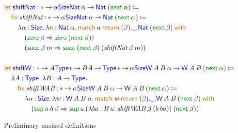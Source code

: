 \documentclass{article}
\newcommand{\meta}[1]{\mathsf{\textcolor{metacolour}{#1}}}
\newcommand{\ind}[1]{\mathsf{\textcolor{indcolour}{#1}}}
\newcommand{\constr}[1]{\mathsf{\textcolor{constrcolour}{#1}}}
\newcommand{\kw}[1]{\mathsf{\textcolor{kwcolour}{#1}}}
\newcommand{\kwopen}[1]{\kw{#1}\:}
\newcommand{\kwbin}[1]{\:\kw{#1}\:}
\newcommand{\arr}[2]{#1 \mathbin{\rightarrow} #2}
\newcommand{\lam}[3]{\lambda #1 \mathbin{:} #2 \mathpunct{.} #3}
\newcommand{\app}[2]{#1 \: #2}
\newcommand{\Let}[3]{\kwopen{let} \mathopen{} #1 \mathbin{:} #2 \mathbin{\coloneqq} #3}
\newcommand{\Type}[1]{\ind{Type}_{#1}}
\newcommand{\match}[3]{\kwopen{match} #1 \kwbin{return} #2 \kwbin{with} #3}
\newcommand{\fix}[3]{\kwopen{fix} #1 \mathbin{:} #2 \mathbin{\coloneqq} #3}
\newcommand{\Size}{\ind{Size}}
\newcommand{\next}{\constr{next}}
\newcommand{\Nat}{\ind{Nat}}
\newcommand{\zero}{\constr{zero}}
\renewcommand{\succ}{\constr{succ}}
\newcommand{\Wtype}{\ind{W}}
\renewcommand{\sup}{\ind{\constr{sup}}}
\newcommand{\any}{\meta{\texttt{\_}}}
\begin{document}
\begin{figure}[h]
\begin{align*}
        \hfill \\
        &\Let{\ind{shiftNat}}{\arr*{\alpha}{\Size}{\arr{\app{\Nat}{\alpha}}{\app{\Nat}{(\app{\next}{\alpha})\:}}}}{ \\
        &\quad\fix{\textit{shiftNat}}{\arr*{\alpha}{\Size}{\arr{\app{\Nat}{\alpha}}{\app{\Nat}{(\app{\next}{\alpha})\:}}}}{ \\
        &\qquad\lam{\alpha}{\Size}{\lam{n}{\app{\Nat}{\alpha}}{\match{n}{(\beta).\any.\app{\Nat}{(\app{\next}{\beta})}}{ \\
        &\quad\qquad (\app{\zero}{\beta} \Rightarrow \app{\zero}{(\app{\next}{\beta})}) \\
        &\quad\qquad (\app{\app{\succ}{\beta}}{m} \Rightarrow \app{\app{\succ}{(\app{\next}{\beta})}}{(\app{\app{\textit{shiftNat}}{\beta}}{m})})}}}}} \\
        \hfill \\
        &\Let{\ind{shiftW}}{\arr*{A}{\Type{}}{\arr*{B}{\arr{A}{\Type{}}}{\arr*{\alpha}{\Size}{\arr{\app{\app{\app{\Wtype}{A}}{B}}{\alpha}}{\app{\app{\app{\Wtype}{A}}{B}}{(\app{\next}{\alpha})\:}}}}}}{ \\
        &\quad\lam{A}{\Type{}}{\lam{B}{\arr{A}{\Type{}}}{ \\
        &\qquad\fix{\textit{shiftWAB}}{\arr*{\alpha}{\Size}{\arr{\app{\app{\app{\Wtype}{A}}{B}}{\alpha}}{\app{\app{\app{\Wtype}{A}}{B}}{(\app{\next}{\alpha})\:}}}}{ \\
        &\quad\qquad\lam{\alpha}{\Size}{\lam{w}{\app{\app{\app{\Wtype}{A}}{B}}{\alpha}}{\match{w}{(\beta).\any.\app{\app{\app{\Wtype}{A}}{B}}{(\app{\next}{\beta})}}{ \\
        &\qquad\qquad (\app{\app{\app{\sup}{a}}{b}}{\beta} \Rightarrow \app{\app{\app{\sup}{a}}{(\lam{ba}{\app{B}{a}}{\app{\app{\textit{shiftWAB}}{\beta}}{(\app{b}{ba})}})}}{(\app{\next}{\beta})})}}}}}}}
    \end{align*}
    \caption{Preliminary unsized definitions}
    \label{fig:unsized-defs}
\end{figure}
\end{document}
